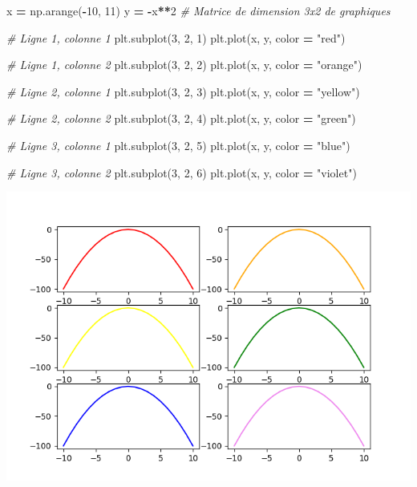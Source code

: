 \documentclass[
  12pt,
]{book}
\newenvironment{Shaded}{\begin{snugshade}}{\end{snugshade}}
\newcommand{\CommentTok}[1]{\textcolor[rgb]{0.56,0.35,0.01}{\textit{#1}}}
\newcommand{\DecValTok}[1]{\textcolor[rgb]{0.00,0.00,0.81}{#1}}
\newcommand{\NormalTok}[1]{#1}
\newcommand{\OperatorTok}[1]{\textcolor[rgb]{0.81,0.36,0.00}{\textbf{#1}}}
\newcommand{\StringTok}[1]{\textcolor[rgb]{0.31,0.60,0.02}{#1}}
\numberwithin{equation}{section}
\numberwithin{countremarque}{section}
\begin{document}
\begin{Shaded}
\begin{Highlighting}[]
\NormalTok{x }\OperatorTok{=}\NormalTok{ np.arange(}\OperatorTok{{-}}\DecValTok{10}\NormalTok{, }\DecValTok{11}\NormalTok{)}
\NormalTok{y }\OperatorTok{=} \OperatorTok{{-}}\NormalTok{x}\OperatorTok{**}\DecValTok{2}
\CommentTok{\# Matrice de dimension 3x2 de graphiques}

\CommentTok{\# Ligne 1, colonne 1}
\NormalTok{plt.subplot(}\DecValTok{3}\NormalTok{, }\DecValTok{2}\NormalTok{, }\DecValTok{1}\NormalTok{)}
\NormalTok{plt.plot(x, y, color }\OperatorTok{=} \StringTok{"red"}\NormalTok{)}

\CommentTok{\# Ligne 1, colonne 2}
\NormalTok{plt.subplot(}\DecValTok{3}\NormalTok{, }\DecValTok{2}\NormalTok{, }\DecValTok{2}\NormalTok{)}
\NormalTok{plt.plot(x, y, color }\OperatorTok{=} \StringTok{"orange"}\NormalTok{)}

\CommentTok{\# Ligne 2, colonne 1}
\NormalTok{plt.subplot(}\DecValTok{3}\NormalTok{, }\DecValTok{2}\NormalTok{, }\DecValTok{3}\NormalTok{)}
\NormalTok{plt.plot(x, y, color }\OperatorTok{=} \StringTok{"yellow"}\NormalTok{)}

\CommentTok{\# Ligne 2, colonne 2}
\NormalTok{plt.subplot(}\DecValTok{3}\NormalTok{, }\DecValTok{2}\NormalTok{, }\DecValTok{4}\NormalTok{)}
\NormalTok{plt.plot(x, y, color }\OperatorTok{=} \StringTok{"green"}\NormalTok{)}

\CommentTok{\# Ligne 3, colonne 1}
\NormalTok{plt.subplot(}\DecValTok{3}\NormalTok{, }\DecValTok{2}\NormalTok{, }\DecValTok{5}\NormalTok{)}
\NormalTok{plt.plot(x, y, color }\OperatorTok{=} \StringTok{"blue"}\NormalTok{)}

\CommentTok{\# Ligne 3, colonne 2}
\NormalTok{plt.subplot(}\DecValTok{3}\NormalTok{, }\DecValTok{2}\NormalTok{, }\DecValTok{6}\NormalTok{)}
\NormalTok{plt.plot(x, y, color }\OperatorTok{=} \StringTok{"violet"}\NormalTok{)}
\end{Highlighting}
\end{Shaded}

\begin{center}\includegraphics[width=9.03in]{figs/pyplot/subplot} \end{center}
\end{document}
